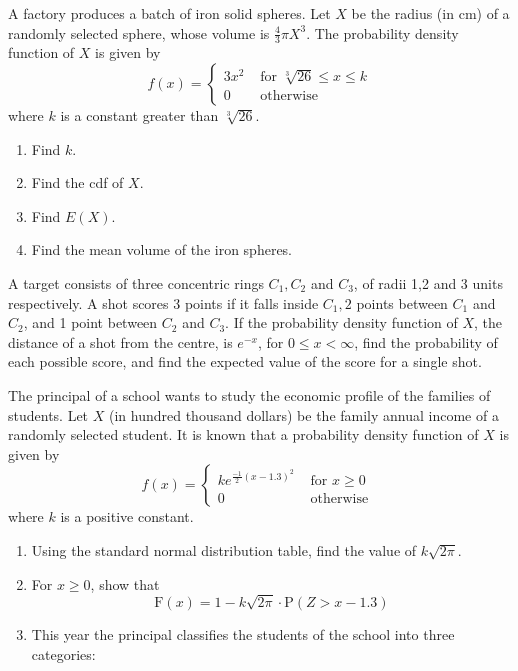 \documentclass[letterpaper,10pt,addpoints]{exam}
\begin{document}


\newpage
\begin{questions}
  \question
  A factory produces a batch of iron solid spheres. Let $X$ be the radius (in $\mathrm{cm}$) of a randomly selected sphere, whose volume is $\frac{4}{3} \pi X^3$. The probability density function of $X$ is given by
  $$
  f(x)=\left\{\begin{array}{cl}
  3 x^2 & \text { for } \sqrt[3]{26} \leq x \leq k \\
  0 & \text { otherwise }
  \end{array}\right.
  $$
  where $k$ is a constant greater than $\sqrt[3]{26}$.
  \begin{enumerate}
    \item Find $k$.
    \item Find the cdf of $X$.
    \item Find $E(X)$.
    \item Find the mean volume of the iron spheres.
  \end{enumerate}

\question
A target consists of three concentric rings $C_1, C_2$ and $C_3$, of radii 1,2 and 3 units respectively. A shot scores 3 points if it falls inside $C_1, 2$ points between $C_1$ and $C_2$, and 1 point between $C_2$ and $C_3$. If the probability density function of $X$, the distance of a shot from the centre, is $e^{-x}$, for $0\le x < \infty$, find the probability of each possible score, and find the expected value of the score for a single shot.

\question
The principal of a school wants to study the economic profile of the families of students. Let $X$ (in hundred thousand dollars) be the family annual income of a randomly selected student. It is known that a probability density function of $X$ is given by
$$
f(x)=\left\{\begin{array}{cc}
k e^{\frac{-1}{2}(x-1.3)^2} & \text { for } x \geq 0 \\
0 & \text { otherwise }
\end{array}\right.
$$
where $k$ is a positive constant.
\begin{enumerate}
  \item Using the standard normal distribution table, find the value of $k \sqrt{2 \pi}$.
  \item For $x \geq 0$, show that
  $$
  \mathrm{F}(x)=1-k \sqrt{2 \pi} \cdot \mathrm{P}(Z>x-1.3)
  $$
  \item This year the principal classifies the students of the school into three categories:
  

\end{enumerate}
\end{questions}
\end{document}
